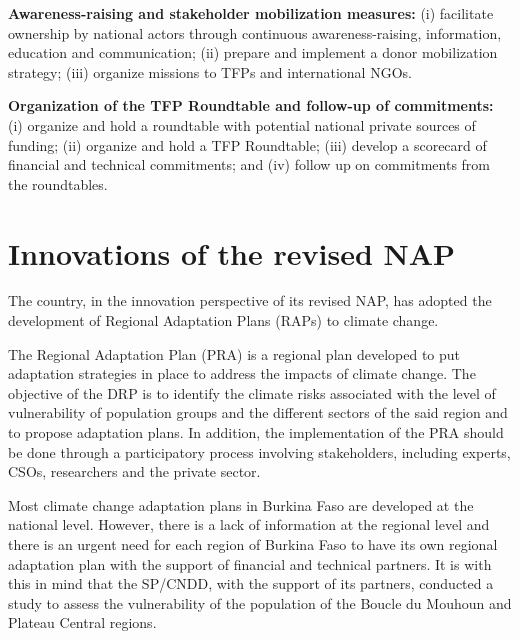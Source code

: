 \documentclass[
]{book}
\begin{document}
\textbf{Awareness-raising and stakeholder mobilization measures:} (i) facilitate ownership by national actors through continuous awareness-raising, information, education and communication; (ii) prepare and implement a donor mobilization strategy; (iii) organize missions to TFPs and international NGOs.

\textbf{Organization of the TFP Roundtable and follow-up of commitments:} (i) organize and hold a roundtable with potential national private sources of funding; (ii) organize and hold a TFP Roundtable; (iii) develop a scorecard of financial and technical commitments; and (iv) follow up on commitments from the roundtables.

\section{Innovations of the revised NAP}\label{innovations-of-the-revised-nap}

The country, in the innovation perspective of its revised NAP, has adopted the development of Regional Adaptation Plans (RAPs) to climate change.

The Regional Adaptation Plan (PRA) is a regional plan developed to put adaptation strategies in place to address the impacts of climate change. The objective of the DRP is to identify the climate risks associated with the level of vulnerability of population groups and the different sectors of the said region and to propose adaptation plans. In addition, the implementation of the PRA should be done through a participatory process involving stakeholders, including experts, CSOs, researchers and the private sector.

Most climate change adaptation plans in Burkina Faso are developed at the national level. However, there is a lack of information at the regional level and there is an urgent need for each region of Burkina Faso to have its own regional adaptation plan with the support of financial and technical partners. It is with this in mind that the SP/CNDD, with the support of its partners, conducted a study to assess the vulnerability of the population of the Boucle du Mouhoun and Plateau Central regions.
\end{document}
